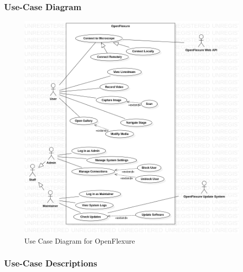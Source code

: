 \subsubsection{Use-Case Diagram}
\begin{figure}[H]
	\centering
	\includegraphics[scale=0.5]{Uml_Images/use_case_diagram}
	\caption{Use Case Diagram for OpenFlexure}
	\label{fig:use_case_diagram}
\end{figure}


\subsubsection{Use-Case Descriptions}
















